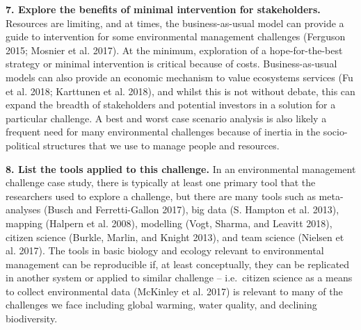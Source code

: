 \documentclass[fleqn,10pt]{wlpeerj} %
\begin{document}
\textbf{7. Explore the benefits of minimal intervention for
stakeholders.} Resources are limiting, and at times, the
business-as-usual model can provide a guide to intervention for some
environmental management challenges (Ferguson 2015; Mosnier et al.
2017). At the minimum, exploration of a hope-for-the-best strategy or
minimal intervention is critical because of costs. Business-as-usual
models can also provide an economic mechanism to value ecosystems
services (Fu et al. 2018; Karttunen et al. 2018), and whilst this is not
without debate, this can expand the breadth of stakeholders and
potential investors in a solution for a particular challenge. A best and
worst case scenario analysis is also likely a frequent need for many
environmental challenges because of inertia in the socio-political
structures that we use to manage people and resources.

\textbf{8. List the tools applied to this challenge.} In an
environmental management challenge case study, there is typically at
least one primary tool that the researchers used to explore a challenge,
but there are many tools such as meta-analyses (Busch and
Ferretti-Gallon 2017), big data (S. Hampton et al. 2013), mapping
(Halpern et al. 2008), modelling (Vogt, Sharma, and Leavitt 2018),
citizen science (Burkle, Marlin, and Knight 2013), and team science
(Nielsen et al. 2017). The tools in basic biology and ecology relevant
to environmental management can be reproducible if, at least
conceptually, they can be replicated in another system or applied to
similar challenge -- i.e.~citizen science as a means to collect
environmental data (McKinley et al. 2017) is relevant to many of the
challenges we face including global warming, water quality, and
declining biodiversity.
\end{document}
